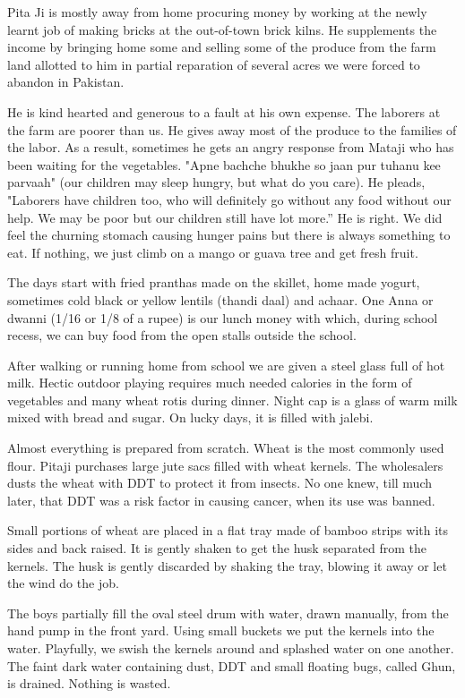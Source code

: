 Pita Ji is mostly away from home procuring money by working at the newly
learnt job of making bricks at the out-of-town brick kilns. He supplements
the income by bringing home some and selling some of the produce from the
farm land allotted to him in partial reparation of several acres we were
forced to abandon in Pakistan. 

He is kind hearted and generous to a fault at his own expense. The
laborers at the farm are poorer than us. He gives away most of the produce
to the families of the labor. As a result, sometimes he gets an angry
response from Mataji who has been waiting for the vegetables. "Apne
bachche bhukhe so jaan pur tuhanu kee parvaah" (our children may sleep
hungry, but what do you care). He pleads, "Laborers have children too, who
will definitely go without any food without our help. We may be poor but
our children still have lot more.” He is right. We did feel the churning
stomach causing hunger pains but there is always something to eat. If
nothing, we just climb on a mango or guava tree and get fresh fruit. 

The days start with fried pranthas made on the skillet, home made yogurt,
sometimes cold black or yellow lentils (thandi daal) and achaar. One Anna
or dwanni (1/16 or 1/8 of a rupee) is our lunch money with which, during
school recess, we can buy food from the open stalls outside the school. 

After walking or running home from school we are given a steel glass full
of hot milk. Hectic outdoor playing requires much needed calories in the
form of vegetables and many wheat rotis during dinner. Night cap is
a glass of warm milk mixed with bread and sugar. On lucky days, it is
filled with jalebi. 

Almost everything is prepared from scratch. Wheat is the most commonly
used flour. Pitaji purchases large jute sacs filled with wheat kernels.
The wholesalers dusts the wheat with DDT to protect it from insects. No
one knew, till much later, that DDT was a risk factor in causing cancer,
when its use was banned. 

Small portions of wheat are placed in a flat tray made of bamboo strips
with its sides and back raised. It is gently shaken to get the husk
separated from the kernels. The husk is gently discarded by shaking the
tray, blowing it away or let the wind do the job. 

The boys partially fill the oval steel drum with water, drawn manually,
from the hand pump in the front yard. Using small buckets we put the
kernels into the water. Playfully, we swish the kernels around and
splashed water on one another. The faint dark water containing dust, DDT
and small floating bugs, called Ghun, is drained. Nothing is wasted. 

